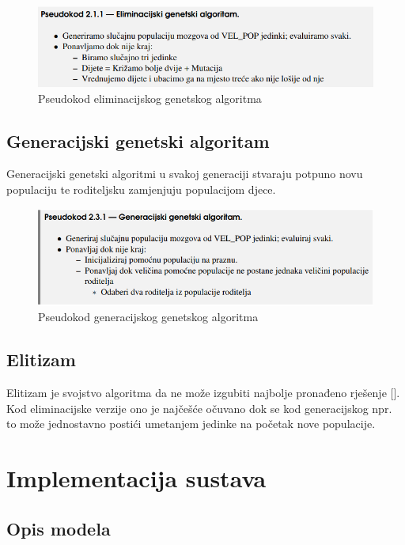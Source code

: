 \documentclass[times, utf8, zavrsni]{fer}
\begin{document}
\begin{figure}[!htb]
	\centering
	\includegraphics[width=15cm]{slike/elimGenAlg.png}
	\caption{Pseudokod eliminacijskog genetskog algoritma}
	\label{fig:elim-gen-alg}
\end{figure}

\subsection{Generacijski genetski algoritam}

Generacijski genetski algoritmi u svakoj generaciji stvaraju potpuno novu populaciju te roditeljsku zamjenjuju populacijom djece. 


\begin{figure}[!htb]
	\centering
	\includegraphics[width=15cm]{slike/genGenAlg.png}
	\caption{Pseudokod generacijskog genetskog algoritma}
	\label{fig:gen-gen-alg}
\end{figure}

\subsection{Elitizam}

Elitizam je svojstvo algoritma da ne može izgubiti najbolje pronađeno rješenje [\citep{UI}]. Kod eliminacijske verzije ono je najčešće očuvano dok se kod generacijskog npr. to može jednostavno postići umetanjem jedinke na početak nove populacije.


\section{Implementacija sustava}

\subsection{Opis modela}
\end{document}
